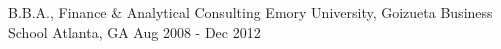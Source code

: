 

\begin{cventries}

  \cventry
    {B.B.A., Finance \& Analytical Consulting} %
    {Emory University, Goizueta Business School} %
    {Atlanta, GA} %
    {Aug 2008 - Dec 2012} %
    {}

\end{cventries}
